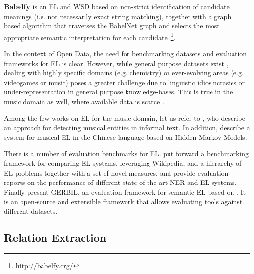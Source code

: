 \vspace{-0.2cm}
\noindent \textbf{Babelfy} \citep{Moroetal2014b} is an EL and WSD based on non-strict identification of candidate meanings (i.e. not necessarily exact string matching), together with a graph based algorithm that traverses the BabelNet graph and selects the most appropriate semantic interpretation for each candidate~\footnote{http://babelfy.org/}.

In the context of Open Data, the need for benchmarking datasets and evaluation frameworks for EL is clear. However, while general purpose datasets exist \citep{Usbeck2015}, dealing with highly specific domains (e.g. chemistry) or ever-evolving areas (e.g. videogames or music) poses a greater challenge due to linguistic idiosincrasies or under-representation in general purpose knowledge-bases. This is true in the music domain as well, where available data is scarce \citep{Gruhl2009}.

Among the few works on EL for the music domain, let us refer to \citep{Gruhl2009}, who describe an approach for detecting musical entities in informal text. In addition, \citep{Zhang2009} describe a system for musical EL in the Chinese language based on Hidden Markov Models. %

There is a number of evaluation benchmarks for EL. \citep{Cornolti2013} put forward a benchmarking framework for comparing EL systems, leveraging Wikipedia, and a hierarchy of EL problems together with a set of novel measures. \citep{Rizzo2014} and \citep{Gangemi2013} provide evaluation reports on the performance of different state-of-the-art NER and EL systems. Finally \citep{Usbeck2015} present GERBIL, an evaluation framework for semantic EL based on \citep{Cornolti2013}. It is an open-source and extensible framework that allows evaluating tools against different datasets.


\subsection{Relation Extraction}
\label{sec:SOA:nlu:relation_extraction}


